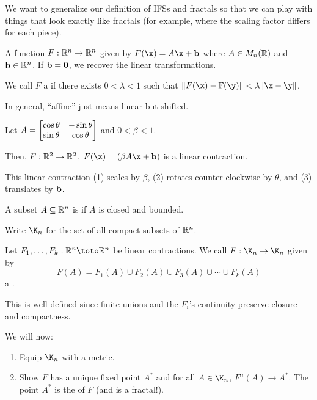 \documentclass[class=pmath370,tikz,notes]{agony}
\begin{document}
We want to generalize our definition of IFSs and fractals
so that we can play with things that look exactly like fractals
(for example, where the scaling factor differs for each piece).

\begin{defn}
  A function $F : \mathbb{R}^n \to \mathbb{R}^n$ given by $F(\x) = A\x + \vb b$
  where $A \in M_n(\mathbb{R})$ and $\vb b \in \mathbb{R}^n$.
  If $\vb b = \vb 0$, we recover the linear transformations.

  We call $F$ a  if there exists $0 < \lambda < 1$
  such that $\norm{F(\x) - \F(\y)} < \lambda\norm{\x - \y}$.
\end{defn}

In general, ``affine'' just means linear but shifted. 

\begin{example}
  Let $A = \mqty[\cos\theta & -\sin\theta \\ \sin\theta & \cos\theta]$ and $0 < \beta < 1$.

  Then, $F : \mathbb{R}^2 \to \mathbb{R}^2$, $F(\x) = (\beta A\x + \vb b)$ is a linear contraction.
\end{example}

This linear contraction (1) scales by $\beta$,
(2) rotates counter-clockwise by $\theta$,
and (3) translates by $\vb b$.

\begin{defn}[compactness]
  A subset $A \subseteq \mathbb{R}^n$ is  if $A$ is closed and bounded.

  Write $\K_n$ for the set of all compact subsets of $\mathbb{R}^n$.
\end{defn}

\begin{defn}
  Let $F_1,\dotsc,F_k : \R^n \toto \R^n$ be linear contractions.
  We call $F : \K_n \to \K_n$ given by
  \[ F(A) = F_1(A) \cup F_2(A) \cup F_3(A) \cup \dotsb \cup F_k(A) \]
  a .
\end{defn}

This is well-defined since finite unions and the $F_i$'s continuity
preserve closure and compactness.

We will now:
\begin{enumerate}[nosep]
  \item Equip $\K_n$ with a metric.
  \item Show $F$ has a unique fixed point $A^*$ and for all $A \in \K_n$, $F^n(A) \to A^*$.
        The point $A^*$ is the  of $F$ (and is a fractal!).
\end{enumerate}
\end{document}
